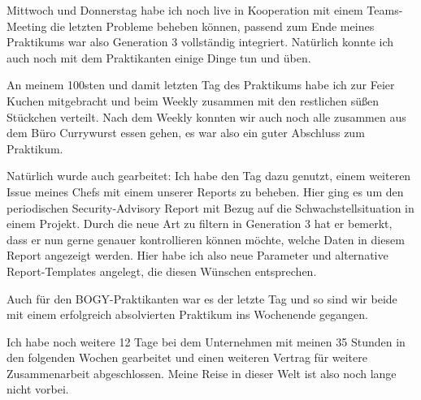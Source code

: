 Mittwoch und Donnerstag habe ich noch live in Kooperation mit einem Teams-Meeting die letzten Probleme beheben können, passend zum Ende meines Praktikums war also Generation 3 vollständig integriert.
Natürlich konnte ich auch noch mit dem Praktikanten einige Dinge tun und üben.

\sweekdaymarginpar{\weekdayFridayLong}

An meinem 100sten und damit letzten Tag des Praktikums habe ich zur Feier Kuchen mitgebracht und beim Weekly zusammen mit den restlichen süßen Stückchen verteilt.
Nach dem Weekly konnten wir auch noch alle zusammen aus dem Büro Currywurst essen gehen, es war also ein guter Abschluss zum Praktikum.

Natürlich wurde auch gearbeitet:
Ich habe den Tag dazu genutzt, einem weiteren Issue meines Chefs mit einem unserer Reports zu beheben.
Hier ging es um den periodischen Security-Advisory Report mit Bezug auf die Schwachstellsituation in einem Projekt.
Durch die neue Art zu filtern in Generation 3 hat er bemerkt, dass er nun gerne genauer kontrollieren können möchte, welche Daten in diesem Report angezeigt werden.
Hier habe ich also neue Parameter und alternative Report-Templates angelegt, die diesen Wünschen entsprechen.

Auch für den BOGY-Praktikanten war es der letzte Tag und so sind wir beide mit einem erfolgreich absolvierten Praktikum ins Wochenende gegangen.

Ich habe noch weitere 12 Tage bei dem Unternehmen mit meinen 35 Stunden in den folgenden Wochen gearbeitet und einen weiteren Vertrag für weitere Zusammenarbeit abgeschlossen.
Meine Reise in dieser Welt ist also noch lange nicht vorbei.
